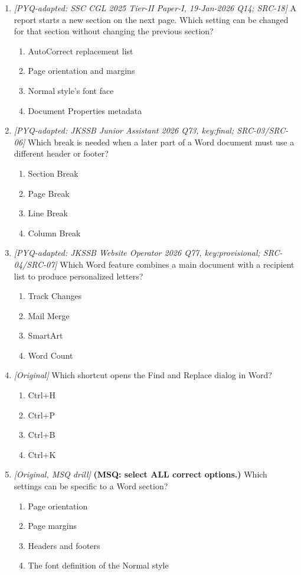 \begin{enumerate}[label=\textbf{Q\arabic*.}, leftmargin=*]
\begin{enumerate}[label=\Alph*.]
  \end{enumerate}
\item \textit{[PYQ-adapted: SSC CGL 2025 Tier-II Paper-I, 19-Jan-2026 Q14; SRC-18]} A report starts a new section on the next page. Which setting can be changed
  for that section without changing the previous section?
  \begin{enumerate}[label=\Alph*.]
\item AutoCorrect replacement list
   \item Page orientation and margins
   \item Normal style's font face
   \item Document Properties metadata
  \end{enumerate}

\item \textit{[PYQ-adapted: JKSSB Junior Assistant 2026 Q73, key:final; SRC-03/SRC-06]} Which break is needed when a later part of a Word document must use a different
  header or footer?
  \begin{enumerate}[label=\Alph*.]
\item Section Break
   \item Page Break
   \item Line Break
   \item Column Break
  \end{enumerate}

\item \textit{[PYQ-adapted: JKSSB Website Operator 2026 Q77, key:provisional; SRC-04/SRC-07]} Which Word feature combines a main document with a recipient list to produce
  personalized letters?
  \begin{enumerate}[label=\Alph*.]
\item Track Changes
   \item Mail Merge
   \item SmartArt
   \item Word Count
  \end{enumerate}

\item \textit{[Original]} Which shortcut opens the Find and Replace dialog in Word?
  \begin{enumerate}[label=\Alph*.]
\item Ctrl+H
   \item Ctrl+P
   \item Ctrl+B
   \item Ctrl+K
  \end{enumerate}

\item \textit{[Original, MSQ drill]} \textbf{(MSQ: select ALL correct options.)} Which settings can be specific to
  a Word section?
  \begin{enumerate}[label=\Alph*.]
\item Page orientation
   \item Page margins
   \item Headers and footers
   \item The font definition of the Normal style
  \end{enumerate}

\end{enumerate}
